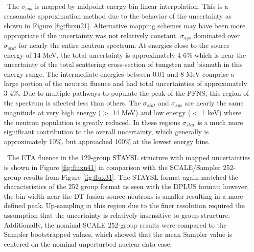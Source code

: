 \ The $\sigma_{sys}$ is mapped by midpoint energy bin linear interpolation.
This is a reasonable approximation method due to the behavior of the uncertainty as shown in Figure  \ref{fig:fluxu21}. 
Alternative mapping schemes may have been more appropriate if the uncertainty was not relatively constant. 
$\sigma_{sys}$ dominated over $\sigma_{stat}$ for nearly the entire neutron spectrum. 
At energies close to the source energy of 14 MeV, the total uncertainty is approximately 4-6\% which is near the uncertainty of the total scattering cross-section of tungsten and bismuth in this energy range. 
The intermediate energies between 0.01 and 8 MeV comprise a large portion of the neutron fluence and had total uncertainties of approximately 3-4\%. 
Due to multiple pathways to populate the peak of the PFNS, this region of the spectrum is affected less than others. 
The $\sigma_{stat}$ and $\sigma_{sys}$ are nearly the same magnitude at very high energy ($>$ 14 MeV) and low energy ($<$ 1 keV) where the neutron population is greatly reduced.
In these regions $\sigma_{stat}$ is a much more significant contribution to the overall uncertainty, which generally is approximately 10\%, but approached 100\% at the lowest energy bins. 

\ The ETA fluence in the 129-group STAYSL structure with mapped uncertainties is shown in Figure \ref{fig:fluxu41} in comparison with the SCALE/Sampler 252-group results from Figure \ref{fig:flux31}.
The STAYSL format again matched the characteristics of the 252 group format as seen with the DPLUS format; however, the bin width near the DT fusion source neutrons is smaller resulting in a more defined peak. 
Up-sampling in this region due to the finer resolution required the assumption that the uncertainty is relatively insensitive to group structure.  
Additionally, the nominal SCALE 252-group results were compared to the Sampler bootstrapped values, which showed that the mean Sampler value is centered on the nominal unperturbed nuclear data case. 

